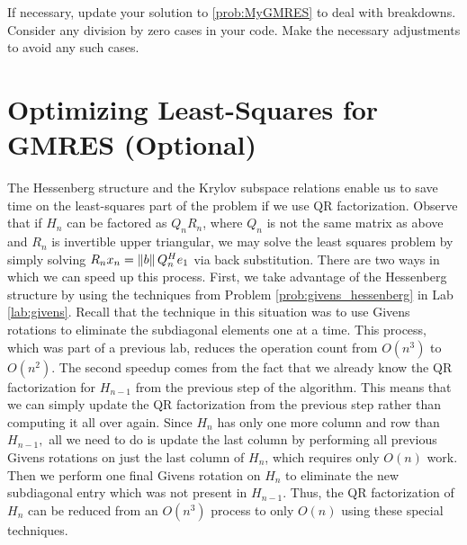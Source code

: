 \begin{problem}
If necessary, update your solution to \ref{prob:MyGMRES} to deal with breakdowns.
Consider any division by zero cases in your code.  Make the necessary adjustments to avoid any such cases.
\label{prob:GMRES3}
\end{problem}

\section*{Optimizing Least-Squares for GMRES (Optional)}
The Hessenberg structure and the Krylov subspace relations enable us to save time on the least-squares part of the problem if we use QR factorization.
Observe that if $H_n$ can be factored as $Q_n R_n$, where $Q_n$ is not the same matrix as above and $R_n$ is invertible upper triangular, we may solve the least squares problem by simply solving $R_n x_n=\left\lVert b\right\rVert Q_{n}^{H}e_1$ via back substitution.
There are two ways in which we can speed up this process.
First, we take advantage of the Hessenberg structure by using the techniques from Problem \ref{prob:givens_hessenberg} in Lab \ref{lab:givens}.
Recall that the technique in this situation was to use Givens rotations to eliminate the subdiagonal elements one at a time.
This process, which was part of a previous lab, reduces the operation count from $O(n^3)$ to $O(n^2)$.
The second speedup comes from the fact that we already know the QR factorization for $H_{n-1}$ from the previous step of the algorithm.
This means that we can simply update the QR factorization from the previous step rather than computing it all over again.
Since $H_{n}$ has only one more column and row than $H_{n-1},$ all we need to do is update the last column by performing all previous Givens rotations on just the last column of $H_n$, which requires only $O(n)$ work.
Then we perform one final Givens rotation on $H_n$ to eliminate the new subdiagonal entry which was not present in $H_{n-1}$.
Thus, the QR factorization of $H_n$ can be reduced from an $O(n^3)$ process to only $O(n)$ using these special techniques.

